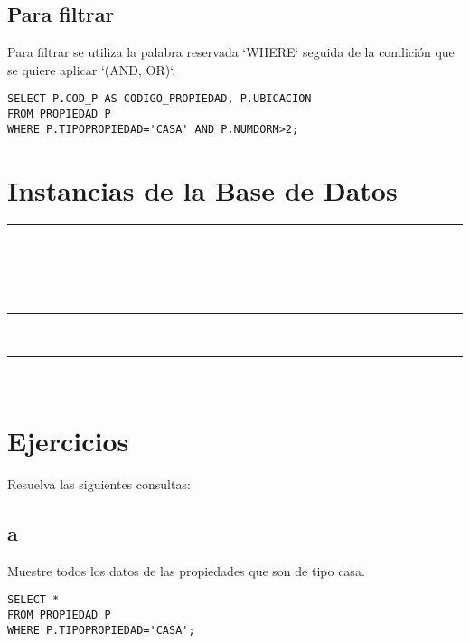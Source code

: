 \documentclass{templateNote}
\begin{document}
\newpage
\subsection{Para filtrar}
\indent
Para filtrar se utiliza la palabra reservada `WHERE` seguida de la condición que se quiere aplicar `(AND, OR)`.
\begin{tcolorbox}
    [colback=gray!5!white,colframe=gray!75!black,fonttitle=\bfseries,title=SQL]
    \begin{sqlcode}
    \end{sqlcode}
    \begin{verbatim}
SELECT P.COD_P AS CODIGO_PROPIEDAD, P.UBICACION
FROM PROPIEDAD P
WHERE P.TIPOPROPIEDAD='CASA' AND P.NUMDORM>2;
    \end{verbatim}
\end{tcolorbox}

\newpage
\section{Instancias de la Base de Datos}
\begin{samepage}
    \rule{\linewidth}{0.2 mm}\\[-0.4 cm]
    \rule{\linewidth}{0.2 mm}\\[-0.4 cm]
    \rule{\linewidth}{0.2 mm}\\[-0.4 cm]
    \rule{\linewidth}{0.2 mm}\\[-0.4 cm]
\end{samepage}

\newpage
\section{Ejercicios}
\indent
Resuelva las siguientes consultas:

\subsection{a}
\indent
Muestre todos los datos de las propiedades que son de tipo casa.
\begin{tcolorbox}
    [colback=gray!5!white,colframe=gray!75!black,fonttitle=\bfseries,title=SQL]
    \begin{sqlcode}
    \end{sqlcode}
    \begin{verbatim}
SELECT * 
FROM PROPIEDAD P
WHERE P.TIPOPROPIEDAD='CASA';
    \end{verbatim}
\end{tcolorbox}
\end{document}

